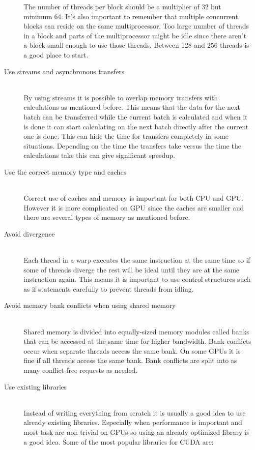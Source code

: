 \documentclass[10pt,a4paper]{report}
\begin{document}
\begin{description}
  The number of threads per block should be a multiplier of 32 but minimum 64. It's also important to remember that multiple concurrent blocks can reside on the same multiprocessor. Too large number of threads in a block and parts of the multiprocessor might be idle since there aren't a block small enough to use those threads. Between 128 and 256 threads is a good place to start.\cite{cuda_best_practice}
  \item[Use streams and asynchronous transfers] \hfill \\
  By using streams it is possible to overlap memory transfers with calculations as mentioned before. This means that the data for the next batch can be transferred while the current batch is calculated and when it is done it can start calculating on the next batch directly after the current one is done. This can hide the time for transfers completely in some situations. Depending on the time the transfers take versus the time the calculations take this can give significant speedup.\cite{cuda, overlap_transfers_cuda, kepler_tuning_guide}
  \item[Use the correct memory type and caches] \hfill \\
  Correct use of caches and memory is important for both CPU\cite{drepper2007cpumemory} and GPU. However it is more complicated on GPU since the caches are smaller and there are several types of memory as mentioned before\cite{cuda, cuda_best_practice}.
  \item[Avoid divergence] \hfill \\
  Each thread in a warp executes the same instruction at the same time so if some of threads diverge the rest will be ideal until they are at the same instruction again. This means it is important to use control structures such as if statements carefully to prevent threads from idling.\cite{cuda, cuda_best_practice}
  \item[Avoid memory bank conflicts when using shared memory] \hfill \\
  Shared memory is divided into equally-sized memory modules called banks that can be accessed at the same time for higher bandwidth. Bank conflicts occur when separate threads access the same bank. On some GPUs it is fine if all threads access the same bank. Bank conflicts are split into as many conflict-free requests as needed.\cite{cuda, cuda_best_practice}
  \item[Use existing libraries] \hfill \\
  Instead of writing everything from scratch it is usually a good idea to use already existing libraries. Especially when performance is important and most task are non trivial on GPUs so using an already optimized library is a good idea. Some of the most popular libraries for CUDA are:

\end{description}
\end{document}
